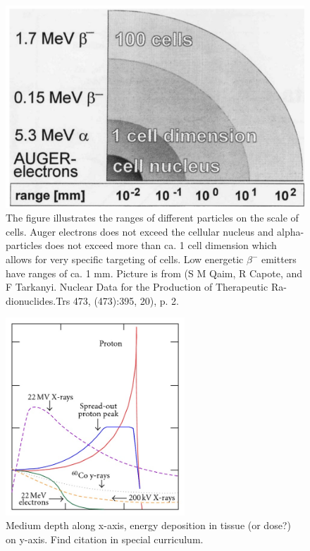 \begin{figure}
    \centering
    \includegraphics{Theory/cell_dimension.png}
    \caption{The figure illustrates the ranges of different particles on the scale of cells. Auger electrons does not exceed the cellular nucleus and alpha-particles does not exceed more than ca. 1 cell dimension which allows for very specific targeting of cells. Low energetic $\beta^-$ emitters have ranges of ca. 1 mm. Picture is from (S M Qaim, R Capote, and F Tarkanyi.  Nuclear Data for the Production of Therapeutic Ra-dionuclides.Trs 473, (473):395, 20), p. 2. }
    \label{fig:cell_dimension}
\end{figure}


\begin{figure}
    \centering
    \includegraphics[width=0.6\textwidth]{Theory/Bragg-peak-and-Spread-Out-Bragg-Peak-SOBP-for-a-proton-beam-in-comparison-with-photon.jpg}
    \caption{Medium depth along x-axis, energy deposition in tissue (or dose?) on y-axis. Find citation in special curriculum. }
    \label{fig:particle_interaction}
\end{figure}


